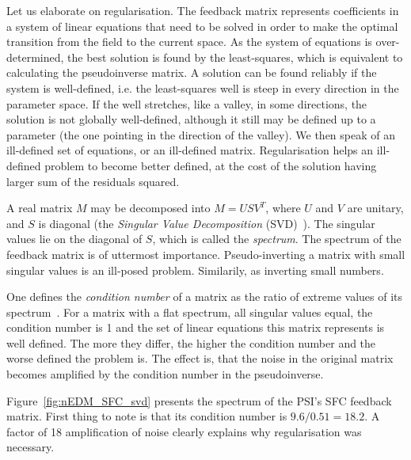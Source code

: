Let us elaborate on regularisation. The feedback matrix represents coefficients in a system of linear equations that need to be solved in order to make the optimal transition from the field to the current space. As the system of equations is over-determined, the best solution is found by the least-squares, which is equivalent to calculating the pseudoinverse matrix. A solution can be found reliably if the system is well-defined, i.e. the least-squares well is steep in every direction in the parameter space. If the well stretches, like a valley, in some directions, the solution is not globally well-defined, although it still may be defined up to a parameter (the one pointing in the direction of the valley). We then speak of an ill-defined set of equations, or an ill-defined matrix. Regularisation helps an ill-defined problem to become better defined, at the cost of the solution having larger sum of the residuals squared.

A real matrix $M$ may be decomposed into $M = U S V^T$, where $U$ and $V$ are unitary, and $S$ is diagonal (the \emph{Singular Value Decomposition} (SVD)~\cite{Golub1965}). The singular values lie on the diagonal of $S$, which is called the \emph{spectrum}. The spectrum of the feedback matrix is of uttermost importance. Pseudo-inverting a matrix with small singular values is an ill-posed problem. Similarily, as inverting small numbers.

One defines the \emph{condition number} of a matrix as the ratio of extreme values of its spectrum~\cite{Regression}. For a matrix with a flat spectrum, all singular values equal, the condition number is 1 and the set of linear equations this matrix represents is well defined. The more they differ, the higher the condition number and the worse defined the problem is. The effect is, that the noise in the original matrix becomes amplified by the condition number in the pseudoinverse.

Figure~\ref{fig:nEDM_SFC_svd} presents the spectrum of the PSI's SFC feedback matrix. First thing to note is that its condition number is $9.6 / 0.51 = 18.2$. A factor of 18 amplification of noise clearly explains why regularisation was necessary.

